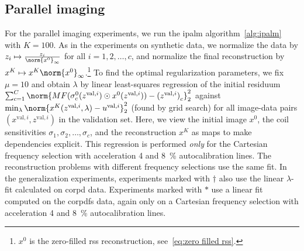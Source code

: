 \subsection{Parallel imaging}%
\label{ssec:methods pi}
For the parallel imaging experiments, we run the \gls{ipalm} algorithm~\cref{alg:ipalm} with \( K = \num{100} \).
As in the experiments on synthetic data, we normalize the data by \( z_i \mapsto \frac{z_i}{\norm{x^{0}}_\infty} \) for all \( i = \num{1}, \num{2}, \dotsc, c \), and normalize the final reconstruction by \( x^K \mapsto x^K\norm{x^{\num{0}}}_\infty \).\footnote{\( x^{0} \) is the zero-filled \gls{rss} reconstruction, see~\cref{eq:zero filled rss}.}
To find the optimal regularization parameters, we fix \( \mu = \num{10} \) and obtain \( \lambda \) by linear least-squares regression of the initial residuum \( \sum_{c=\num{1}}^C \norm{\Mask\Fourier(\sigma_{c}^{\num{0}}(z^{\text{val},i}) \odot x^{\num{0}}(z^{\text{val},i})) - {(z^{\text{val},i})}_{c}}_{\num{2}}^{\num{2}} \) against \( \min_{\lambda} \norm{x^{K}(z^{\text{val},i}, \lambda) - u^{\text{val},i}}_{\num{2}}^{\num{2}} \) (found by grid search) for all image-data pairs \( (x^{\text{val},i}, z^{\text{val},i}) \) in the validation set.
Here, we view the initial image \( x^{\num{0}} \), the coil sensitivities \( \sigma_{\num{1}}, \sigma_{\num{2}},\dotsc,\sigma_c \), and the reconstruction \( x^{K} \) as maps to make dependencies explicit.
This regression is performed \emph{only} for the Cartesian frequency selection with acceleration \num{4} and \qty{8}{\percent} autocalibration lines.
The reconstruction problems with different frequency selections use the same fit.
In the generalization experiments, experiments marked with \( \dagger \) also use the linear \( \lambda \)-fit calculated on \gls{corpd} data.
Experiments marked with \( * \) use a linear fit computed on the \gls{corpdfs} data, again only on a Cartesian frequency selection with acceleration \num{4} and \qty{8}{\percent} autocalibration lines.

